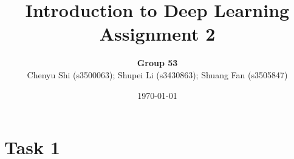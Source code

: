 \documentclass{article}
\title{Introduction to Deep Learning\\Assignment 2} %
\author{\textbf{Group 53}\\Chenyu Shi (s3500063); Shupei Li (s3430863); Shuang Fan (s3505847)} %
\date{\today} %
\begin{document}

	\maketitle %
    
	\section*{Task 1}
\end{document}
